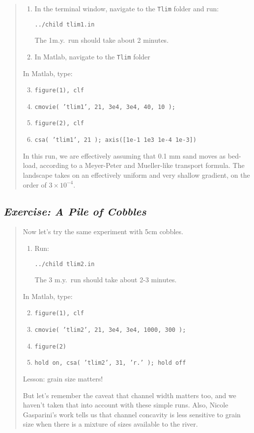 \documentclass[12pt,reqno]{amsart}
\begin{document}
\begin{quote}
\small
{\sf
\begin{enumerate}
\item
In the terminal window, navigate to the {\tt Tlim} folder and run:

{\tt ../child tlim1.in}

The 1m.y.\ run should take about 2 minutes.
\item
In Matlab, navigate to the {\tt Tlim} folder
\end{enumerate}

\noindent
In Matlab, type:
\begin{enumerate}
\setcounter{enumi}{2}
\item
{\tt figure(1), clf}
\item
{\tt cmovie( 'tlim1', 21, 3e4, 3e4, 40, 10 );}
\item
{\tt figure(2), clf}
\item
{\tt csa( 'tlim1', 21 ); axis([1e-1 1e3 1e-4 1e-3])}
\end{enumerate}

\noindent
In this run, we are effectively assuming that 0.1 mm sand moves as bed-load, according to a Meyer-Peter and Mueller-like transport formula. The landscape takes on an effectively uniform and very shallow gradient, on the order of $3\times 10^{-4}$.
}
\end{quote}

\subsection*{\em Exercise: A Pile of Cobbles}

\begin{quote}
\small
{\sf
Now let's try the same experiment with 5cm cobbles.

\begin{enumerate}
\item
Run:

{\tt ../child tlim2.in}

The 3 m.y.\ run should take about 2-3 minutes.
\end{enumerate}

\noindent
In Matlab, type:
\begin{enumerate}
\setcounter{enumi}{1}
\item
{\tt figure(1), clf}
\item
{\tt cmovie( 'tlim2', 21, 3e4, 3e4, 1000, 300 );}
\item
{\tt figure(2)}
\item
{\tt hold on, csa( 'tlim2', 31, 'r.' ); hold off}
\end{enumerate}

Lesson: grain size matters! 

But let's remember the caveat that channel width matters too, and we
haven't taken that into account with these simple runs. Also, Nicole
Gasparini's work \citep{gasparini1999downstream,gasparini2004network}
tells us that channel concavity is less sensitive to grain size when
there is a mixture of sizes available to the river.
}
\end{quote}
\end{document}
